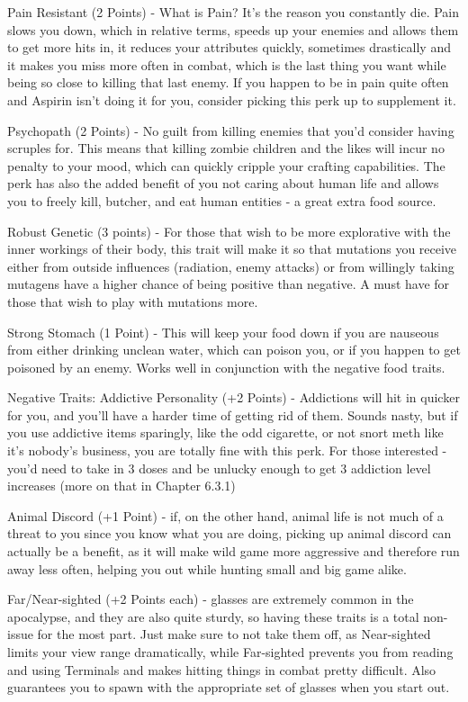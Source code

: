 \documentclass[11pt]{report}
\begin{document}
Pain Resistant (2 Points) - What is Pain? It's the reason you constantly die. Pain slows you down, which in relative terms, speeds up your enemies and allows them to get more hits in, it reduces your attributes quickly, sometimes drastically and it makes you miss more often in combat, which is the last thing you want while being so close to killing that last enemy. If you happen to be in pain quite often and Aspirin isn't doing it for you, consider picking this perk up to supplement it.

Psychopath (2 Points) - No guilt from killing enemies that you'd consider having scruples for. This means that killing zombie children and the likes will incur no penalty to your mood, which can quickly cripple your crafting capabilities. The perk has also the added benefit of you not caring about human life and allows you to freely kill, butcher, and eat human entities - a great extra food source.

Robust Genetic (3 points) - For those that wish to be more explorative with the inner workings of their body, this trait will make it so that mutations you receive either from outside influences (radiation, enemy attacks) or from willingly taking mutagens have a higher chance of being positive than negative. A must have for those that wish to play with mutations more.

Strong Stomach (1 Point) - This will keep your food down if you are nauseous from either drinking unclean water, which can poison you, or if you happen to get poisoned by an enemy. Works well in conjunction with the negative food traits.

Negative Traits:
Addictive Personality (+2 Points) - Addictions will hit in quicker for you, and you'll have a harder time of getting rid of them. Sounds nasty, but if you use addictive items sparingly, like the odd cigarette, or not snort meth like it's nobody's business, you are totally fine with this perk. For those interested - you'd need to take in 3 doses and be unlucky enough to get 3 addiction level increases (more on that in Chapter 6.3.1)

Animal Discord (+1 Point) - if, on the other hand, animal life is not much of a threat to you since you know what you are doing, picking up animal discord can actually be a benefit, as it will make wild game more aggressive and therefore run away less often, helping you out while hunting small and big game alike.

Far/Near-sighted (+2 Points each) - glasses are extremely common in the apocalypse, and they are also quite sturdy, so having these traits is a total non-issue for the most part. Just make sure to not take them off, as Near-sighted limits your view range dramatically, while Far-sighted prevents you from reading and using Terminals and makes hitting things in combat pretty difficult. Also guarantees you to spawn with the appropriate set of glasses when you start out.
\end{document}
